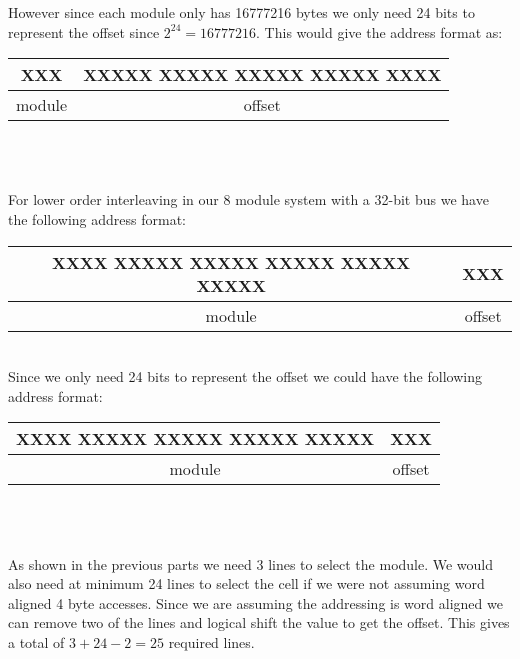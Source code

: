 \documentclass[11pt,reqno]{article}
\begin{document}
However since each module only has 16777216 bytes we only need 24 bits to represent the offset since $2^{24} = 16777216$. This would give the address format as:\\

\begin{tabular}{| c | c |}
\hline
XXX & XXXXX XXXXX XXXXX XXXXX XXXX \\ \hline
module & offset \\ \hline
\end{tabular}\\
\vspace{10pt}

\noindent{}\\ 

\noindent For lower order interleaving in our 8 module system with a 32-bit bus we have the following address format:\\

\begin{tabular}{| c | c |}
\hline
XXXX XXXXX XXXXX XXXXX XXXXX XXXXX & XXX \\ \hline
module & offset \\ \hline
\end{tabular}
\vspace{10pt}\\
Since we only need 24 bits to represent the offset we could have the following address format:\\

\begin{tabular}{| c | c |}
\hline
XXXX XXXXX XXXXX XXXXX XXXXX & XXX\\ \hline
module & offset \\ \hline
\end{tabular}\\
\vspace{10pt}

\noindent{}\\ 

As shown in the previous parts we need 3 lines to select the module. We would also need at minimum 24 lines to select the cell if we were not assuming word aligned 4 byte accesses. Since we are assuming the addressing is word aligned we can remove two of the lines and logical shift the value to get the offset. This gives a total of $3 + 24 - 2 = 25$ required lines.\\

\noindent{}\\ 
\end{document}
